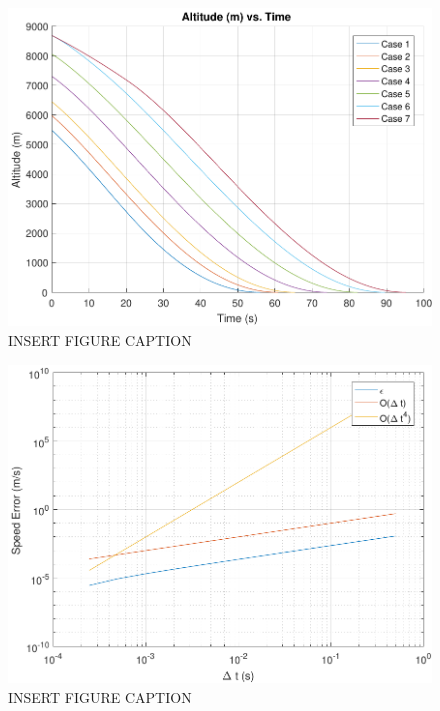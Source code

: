 \begin{figure}[H]
	\centering
	\begin{minipage}{4.5 in}
		\includegraphics[width=\linewidth]{Figures/altpowatmo.pdf}
		\caption{INSERT FIGURE CAPTION \label{fig:altpowatmo} }
	\end{minipage}
\end{figure}










\begin{figure}[H]
	\centering
	\begin{minipage}{4.5 in}
		\includegraphics[width=\linewidth]{Figures/convtestatmo.pdf}
		\caption{INSERT FIGURE CAPTION \label{fig:convtestatmo} }
	\end{minipage}
\end{figure}



